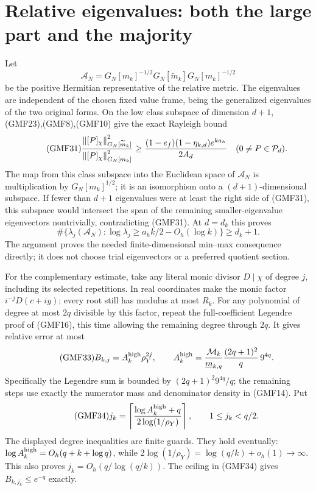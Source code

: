 \section{Relative eigenvalues: both the large part and the majority}

Let
\[
 \mathcal A_N=
 G_N[m_k]^{-1/2}G_N[\widetilde m_k]G_N[m_k]^{-1/2}
\]
be the positive Hermitian representative of the relative metric.
The eigenvalues are independent of the chosen fixed value frame,
being the generalized eigenvalues of the two original forms.
On the low class subspace of dimension \(d+1\),
(GMF23),(GMF8),(GMF10) give the exact Rayleigh bound
\begin{equation}\tag{GMF31}
 \frac{\left\lVert[P]_\chi\right\rVert_{G_N[\widetilde m_k]}^2}
      {\left\lVert[P]_\chi\right\rVert_{G_N[m_k]}^2}
 \ge
 \frac{(1-e_f)(1-\eta_{k,d})e^{ka_h}}{2A_d}
 \quad(0\ne P\in\mathcal P_d).
\end{equation}
The map from this class subspace into the Euclidean space of
\(\mathcal A_N\) is multiplication by \(G_N[m_k]^{1/2}\);
it is an isomorphism onto a \((d+1)\)-dimensional subspace.
If fewer than \(d+1\) eigenvalues were at least the right
side of (GMF31), this subspace would intersect the span
of the remaining smaller-eigenvalue eigenvectors nontrivially,
contradicting (GMF31).
At \(d=d_k\) this proves
\begin{equation}\tag{GMF32}
 \#\{\lambda_j(\mathcal A_N):
 \log\lambda_j\ge a_hk/2-O_h(\log k)\}\ge d_k+1.
\end{equation}
The argument proves the needed finite-dimensional min--max
consequence directly; it does not choose trial eigenvectors
or a preferred quotient section.

For the complementary estimate, take any literal monic
divisor \(D\mid\chi\) of degree \(j\), including its selected
repetitions.  In real coordinates make the monic factor
\(i^{-j}D(c+iy)\); every root still has modulus at most \(R_k\).
For any polynomial of degree at most \(2q\) divisible by
this factor, repeat the full-coefficient Legendre proof of
(GMF16), this time allowing the remaining degree through
\(2q\).  It gives relative error at most
\begin{equation}\tag{GMF33}
 B_{k,j}=A_k^{\rm high}\rho_Y^{2j},\qquad
 A_k^{\rm high}=
 \frac{\mathcal M_k}{\underline m_{k,q}}
 \frac{(2q+1)^2}{q}\,9^{4q}.
\end{equation}
Specifically the Legendre sum is bounded by
\((2q+1)^2 9^{4q}/q\); the remaining steps use exactly
the numerator mass and denominator density in (GMF14).
Put
\begin{equation}\tag{GMF34}
 j_k=\left\lceil
 \frac{\log A_k^{\rm high}+q}{2\log(1/\rho_Y)}
 \right\rceil ,
 \qquad 1\le j_k<q/2.
\end{equation}
The displayed degree inequalities are finite guards.
They hold eventually: \(\log A_k^{\rm high}=O_h(q+k+\log q)\),
while
\(2\log(1/\rho_Y)=\log(q/k)+o_h(1)\to\infty\).
This also proves
\(j_k=O_h(q/\log(q/k))\).
The ceiling in (GMF34) gives \(B_{k,j_k}\le e^{-q}\) exactly.

